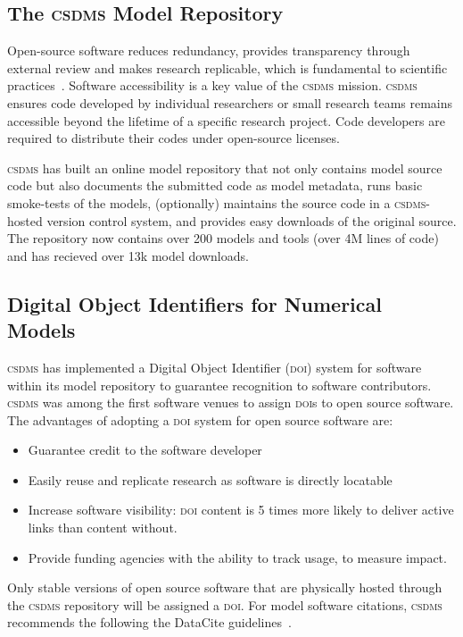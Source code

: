 \documentclass[11pt, oneside]{amsart}
\DeclareRobustCommand{\csdms}{\textsc{csdms}}
\DeclareRobustCommand{\doi}{\textsc{doi}}
\begin{document}
\subsection{The \csdms{} Model Repository}
\label{sec:repository}

Open-source software reduces redundancy, provides transparency through
external review and makes research replicable, which is fundamental to
scientific practices~\cite{ince2012case}.
Software accessibility is a key value of the \csdms{} mission. \csdms{}
ensures code developed by individual researchers or small research teams
remains accessible beyond the lifetime of a specific research project. Code
developers are required to distribute their codes under open-source licenses. 

\csdms{} has built an online model repository that not only contains model
source code but also documents the submitted code as model metadata, runs
basic smoke-tests of the models, (optionally) maintains the source code in a
\csdms{}-hosted version control system, and provides easy downloads of the
original source. The repository now contains over 200 models and tools (over
4M lines of code) and has recieved over 13k model downloads.

\subsection{Digital Object Identifiers for Numerical Models}
\label{sec:doi}

\csdms{} has implemented a
Digital Object Identifier (\doi{}) system for software within its model
repository to guarantee recognition to software contributors.
\csdms{} was among the first software venues to assign \doi{}s to
open source software. The advantages of adopting a \doi{} system for open
source software are: 
\begin{itemize}
\item Guarantee credit to the software developer
\item Easily reuse and replicate research as software is directly locatable 
\item Increase software visibility: \doi{} content is 5 times more likely to
      deliver active links than content without.
\item Provide funding agencies with the ability to track usage, to measure
      impact.
\end{itemize}

Only stable versions of open source
software that are physically hosted through the \csdms{} repository will be
assigned a \doi{}. For model software citations, \csdms{} recommends the
following the DataCite guidelines~\cite{brase2009datacite}.
\end{document}
